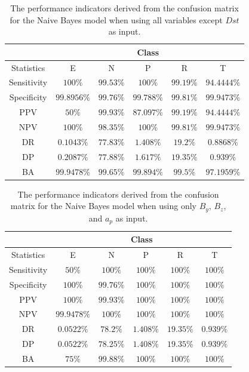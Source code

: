 \documentclass[sn-mathphys-num]{sn-jnl}%
\begin{document}
\begin{table}[!ht]
    \centering
    \caption{The performance indicators derived from the confusion matrix for the Naive Bayes model when using all variables except $Dst$ as input.}
	\label{tab:cs:reverse:no_DisturbanceStormTime:nb}
	\begin{tabular}{|c|c|c|c|c|c|}
		\hline
		 & \multicolumn{5}{c|}{Class} \\ \hline
		Statistics & E & N & P & R & T \\ \hline
		Sensitivity & $100\%$ & $99.53\%$ & $100\%$ & $99.19\%$ & $94.4444\%$ \\ \hline
		Specificity & $99.8956\%$ & $99.76\%$ & $99.788\%$ & $99.81\%$ & $99.9473\%$ \\ \hline
		PPV & $50\%$ & $99.93\%$ & $87.097\%$ & $99.19\%$ & $94.4444\%$ \\ \hline
		NPV & $100\%$ & $98.35\%$ & $100\%$ & $99.81\%$ & $99.9473\%$ \\ \hline
		DR & $0.1043\%$ & $77.83\%$ & $1.408\%$ & $19.2\%$ & $0.8868\%$ \\ \hline
		DP & $0.2087\%$ & $77.88\%$ & $1.617\%$ & $19.35\%$ & $0.939\%$ \\ \hline
		BA & $99.9478\%$ & $99.65\%$ & $99.894\%$ & $99.5\%$ & $97.1959\%$ \\ \hline
	\end{tabular}
\end{table}

\begin{table}[!ht]
    \centering
    \caption{The performance indicators derived from the confusion matrix for the Naive Bayes model when using only $B_{y}$, $B_{z}$, and $a_{p}$ as input.}
	\label{tab:cs:reverse:yzap:nb}
	\begin{tabular}{|c|c|c|c|c|c|}
		\hline
		 & \multicolumn{5}{c|}{Class} \\ \hline
		Statistics & E & N & P & R & T \\ \hline
		Sensitivity & $50\%$ & $100\%$ & $100\%$ & $100\%$ & $100\%$ \\ \hline
		Specificity & $100\%$ & $99.76\%$ & $100\%$ & $100\%$ & $100\%$ \\ \hline
		PPV & $100\%$ & $99.93\%$ & $100\%$ & $100\%$ & $100\%$ \\ \hline
		NPV & $99.9478\%$ & $100\%$ & $100\%$ & $100\%$ & $100\%$ \\ \hline
		DR & $0.0522\%$ & $78.2\%$ & $1.408\%$ & $19.35\%$ & $0.939\%$ \\ \hline
		DP & $0.0522\%$ & $78.25\%$ & $1.408\%$ & $19.35\%$ & $0.939\%$ \\ \hline
		BA & $75\%$ & $99.88\%$ & $100\%$ & $100\%$ & $100\%$ \\ \hline
	\end{tabular}
\end{table}
\end{document}
